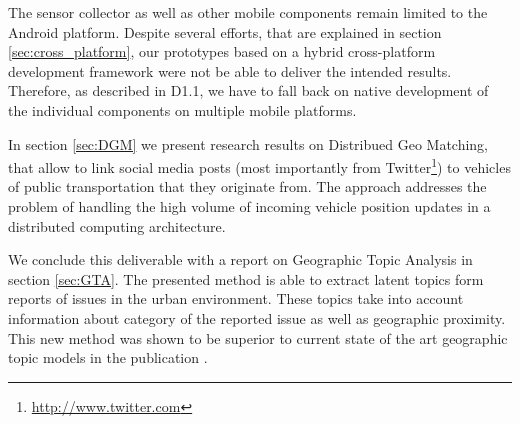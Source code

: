 \documentclass[external]{20120615_deliverable_template_ukob}
\theoremstyle{definition}
\begin{document}
\begin{LGExecutiveSummary}
The sensor collector as well as other mobile components remain limited
to the Android platform. Despite several efforts, that are explained
in section \ref{sec:cross_platform}, our prototypes based on a hybrid
cross-platform development framework were not be able to deliver the
intended results. Therefore, as described in D1.1, we have to fall
back on native development of the individual components on multiple
mobile platforms. 

In section \ref{sec:DGM} we present research results on Distribued Geo
Matching, that allow to link social media posts (most importantly from
Twitter\footnote{\url{http://www.twitter.com}}) to vehicles of public
transportation that they originate from. The approach addresses the
problem of handling the high volume of incoming vehicle position
updates in a distributed computing architecture.

We conclude this deliverable with a report on Geographic Topic
Analysis in section \ref{sec:GTA}. The presented method is able to
extract latent topics form reports of issues in the urban environment.
These topics take into account information about category of the
reported issue as well as geographic proximity. This new method was
shown to be superior to current state of the art geographic topic
models in the publication \cite{CCK1}.

\end{LGExecutiveSummary}
\end{document}
